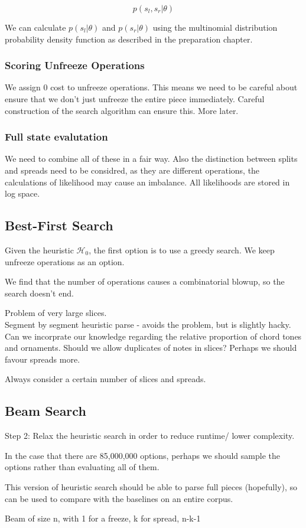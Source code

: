 \documentclass[12pt,a4paper,twoside,openright]{report}
\theoremstyle{definition}
\begin{document}
\[p(s_l, s_r| \theta)\]

We can calculate $p(s_l|\theta)$ and $p(s_r|\theta)$ using the multinomial distribution probability density function as described in the preparation chapter.

\FloatBarrier
\subsubsection{Scoring Unfreeze Operations}
We assign 0 cost to unfreeze operations. This means we need to be careful about ensure that we don't just unfreeze the entire piece immediately. Careful construction of the search algorithm can ensure this. More later.

\FloatBarrier
\subsubsection{Full state evalutation}
We need to combine all of these in a fair way. Also the distinction between splits and spreads need to be considred, as they are different operations, the calculations of likelihood may cause an imbalance. All likelihoods are stored in log space.

\FloatBarrier
\subsection{Best-First Search}
Given the heuristic $\mathcal{H}_0$, the first option is to use a greedy search.
We keep unfreeze operations as an option.

We find that the number of operations causes a combinatorial blowup, so the search doesn't end.

Problem of very large slices.\\ 
Segment by segment heuristic parse - avoids the problem, but is slightly hacky. Can we incorprate our knowledge regarding the relative proportion of chord tones and ornaments. Should we allow duplicates of notes in slices? Perhaps we should favour spreads more. 

Always consider a certain number of slices and spreads.

\subsection{Beam Search}
Step 2: Relax the heuristic search in order to reduce runtime/ lower complexity.
\par 
In the case that there are 85,000,000 options, perhaps we should sample the options rather than evaluating all of them. 
\par 
This version of heuristic search should be able to parse full pieces (hopefully), so can be used to compare with the baselines on an entire corpus.
\par 
Beam of size n, with 1 for a freeze, k for spread, n-k-1 
\end{document}
